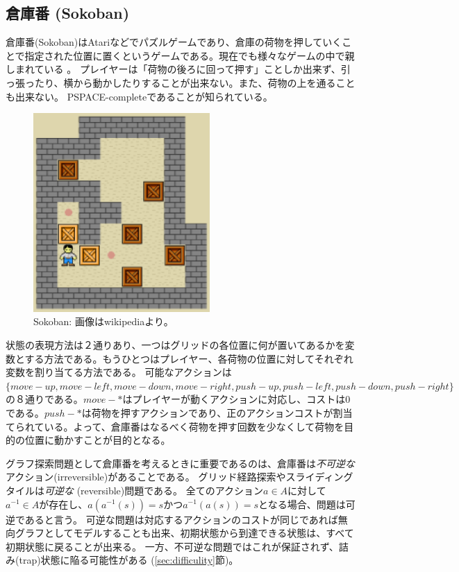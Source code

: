 \documentclass[10pt]{book}
\begin{document}
\subsection{倉庫番 (Sokoban)}
倉庫番(Sokoban)はAtariなどでパズルゲームであり、倉庫の荷物を押していくことで指定された位置に置くというゲームである。現在でも様々なゲームの中で親しまれている \cite{junghanns1997sokoban,culberson1997sokoban}。
プレイヤーは「荷物の後ろに回って押す」ことしか出来ず、引っ張ったり、横から動かしたりすることが出来ない。また、荷物の上を通ることも出来ない。
PSPACE-completeであることが知られている\cite{culberson1997sokoban}。

\begin{figure}
\centering
\includegraphics[bb=0 0 213 238,width=0.6\textwidth]{figures/sokoban.eps}
\caption{Sokoban: 画像はwikipediaより。}
\label{fig:sokoban}
\end{figure}

状態の表現方法は２通りあり、一つはグリッドの各位置に何が置いてあるかを変数とする方法である。もうひとつはプレイヤー、各荷物の位置に対してそれぞれ変数を割り当てる方法である。
可能なアクションは$\{move-up,move-left,move-down,move-right,push-up,push-left,push-down,push-right\}$の８通りである。$move-*$はプレイヤーが動くアクションに対応し、コストは0である。$push-*$は荷物を押すアクションであり、正のアクションコストが割当てられている。よって、倉庫番はなるべく荷物を押す回数を少なくして荷物を目的の位置に動かすことが目的となる。

グラフ探索問題として倉庫番を考えるときに重要であるのは、倉庫番は{\it 不可逆な}アクション(irreversible)があることである。
グリッド経路探索やスライディングタイルは{\it 可逆な} (reversible)問題である。
全てのアクション$a \in A$に対して$a^{-1} \in A$が存在し、$a(a^{-1}(s)) = s$かつ$a^{-1}(a(s)) = s$となる場合、問題は可逆であると言う。
可逆な問題は対応するアクションのコストが同じであれば無向グラフとしてモデルすることも出来、初期状態から到達できる状態は、すべて初期状態に戻ることが出来る。
一方、不可逆な問題ではこれが保証されず、詰み(trap)状態に陥る可能性がある (\ref{sec:difficulity}節)。
\end{document}
